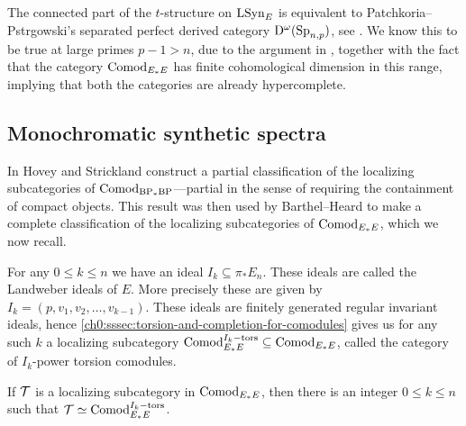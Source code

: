


\begin{conjecture}
    The connected part of the $t$-structure on $\mathrm{LSyn}_{E}$ is equivalent to Patchkoria--Pstr\a{}gowski's separated perfect derived category $\mathrm{D}^\omega(\mathrm{Sp}_{n,p})$, see \cite[6.49]{patchkoria-pstragowski_2021}. We know this to be true at large primes $p-1>n$, due to the argument in \cite[6.57]{patchkoria-pstragowski_2021}, together with the fact that the category $\mathrm{Comod}_{E_*E}$ has finite cohomological dimension in this range, implying that both the categories are already hypercomplete.
\end{conjecture}




\subsection{Monochromatic synthetic spectra}

In \cite{hovey-strickland_2005a} Hovey and Strickland construct a partial classification of the localizing subcategories of $\mathrm{Comod}_{\mathrm{BP}_*\mathrm{BP}}$---partial in the sense of requiring the containment of compact objects. This result was then used by Barthel--Heard to make a complete classification of the localizing subcategories of $\mathrm{Comod}_{E_*E}$, which we now recall. 

For any $0\leq k\leq n$ we have an ideal $I_k \subseteq \pi_* E_n$. These ideals are called the Landweber ideals of $E$. More precisely these are given by $I_k = (p, v_1, v_2, \ldots, v_{k-1})$. These ideals are finitely generated regular invariant ideals, hence \cref{ch0:sssec:torsion-and-completion-for-comodules} gives us for any such $k$ a localizing subcategory $\mathrm{Comod}_{E_*E}^{I_k-\mathrm{tors}}\subseteq \mathrm{Comod}_{E_*E}$, called the category of $I_k$-power torsion comodules. 

\begin{theorem}
    \label{ch3:add:thm:classification-of-abelian-localizing}
    If $\mathcal{T}$ is a localizing subcategory in $\mathrm{Comod}_{E_*E}$, then there is an integer $0\leq k\leq n$ such that $\mathcal{T} \simeq \mathrm{Comod}_{E_*E}^{I_k-\mathrm{tors}}$. 
\end{theorem}

